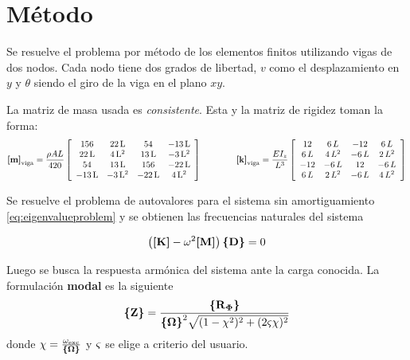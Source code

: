 \documentclass[onecolumn,10pt,titlepage,a4paper]{article}
\begin{document}
\section{Método}
Se resuelve el problema por método de los elementos finitos utilizando vigas de dos nodos. Cada nodo tiene dos grados de libertad, $v$ como el desplazamiento en $y$ y $\theta$ siendo el giro de la viga en el plano $x\!y$.

La matriz de masa usada es \textit{consistente}. Esta y la matriz de rigidez toman la forma: \cite[p.379]{cook2007concepts}
\[
\boldsymbol{[}\mathbf{m} \boldsymbol{]}_{\mathrm{viga}}=\frac{\rho A L}{420}\left[\begin{array}{cccc} 156 & 22\,\mathrm{L} & 54 & -13\,\mathrm{L}\\ 22\,\mathrm{L} & 4\,{\mathrm{L}}^2 & 13\,\mathrm{L} & -3\,{\mathrm{L}}^2\\ 54 & 13\,\mathrm{L} & 156 & -22\,\mathrm{L}\\ -13\,\mathrm{L} & -3\,{\mathrm{L}}^2 & -22\,\mathrm{L} & 4\,{\mathrm{L}}^2 \end{array}\right] \qquad \qquad \boldsymbol{[}\mathbf{k} \boldsymbol{]}_{\mathrm{viga}}=\frac{E I_z}{L^3} \left[\begin{array}{cccc} 12 & 6\,L & -12 & 6\,L\\ 6\,L & 4\,L^2 & -6\,L & 2\,L^2\\ -12 & -6\,L & 12 & -6\,L\\ 6\,L & 2\,L^2 & -6\,L & 4\,L^2 \end{array}\right]
\]

Se resuelve el problema de autovalores para el sistema sin amortiguamiento \eqref{eq:eigenvalueproblem} y se obtienen las frecuencias naturales del sistema 

\begin{equation} \label{eq:eigenvalueproblem}
	\left( \boldsymbol{[}\mathbf{K} \boldsymbol{]} - \omega^2 \boldsymbol{[}\mathbf{M} \boldsymbol{]}\right)\boldsymbol{\{ }\mathbf{D} \boldsymbol{\}}= 0
\end{equation}

Luego se busca la respuesta armónica del sistema ante la carga conocida. La formulación \textbf{modal} es la siguiente
\begin{equation} \label{eq:Zmodal}
	\boldsymbol{\{ }\mathbf{Z} \boldsymbol{\}} = \frac{\boldsymbol{\{ }\mathbf{R{_{\boldsymbol{\Phi}}} } \boldsymbol{\}}}{{\boldsymbol{\{ }\mathbf{\Omega} \boldsymbol{\}}}^2 \sqrt{(1-\chi^2)^2 + (2 \varsigma \chi)^2}}
\end{equation}
donde $\chi = \frac{\omega_{\mathrm{exc}}}{\boldsymbol{\{ }\mathbf{\Omega} \boldsymbol{\}}}$ y $\varsigma$ se elige a criterio del usuario.
\end{document}
